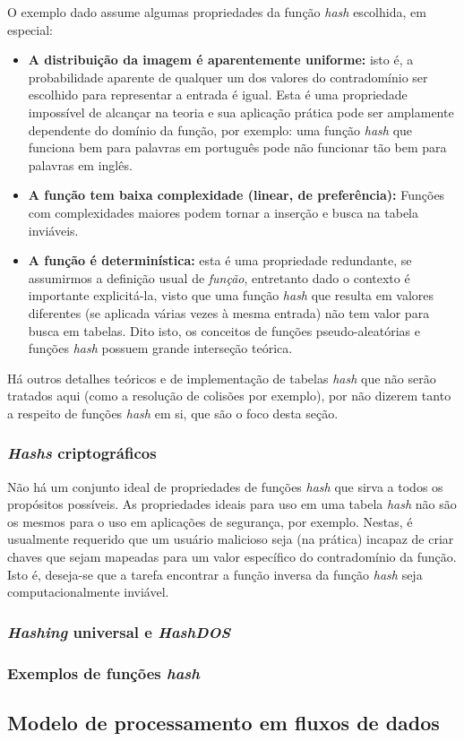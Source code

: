 O exemplo dado assume algumas propriedades da função \emph{hash} escolhida, em especial:
\begin{itemize}
  \item \textbf{A distribuição da imagem é aparentemente uniforme:} isto é, a probabilidade aparente de qualquer um dos valores do contradomínio ser escolhido para representar a entrada é igual. Esta é uma propriedade impossível de alcançar na teoria e sua aplicação prática pode ser amplamente dependente do domínio da função, por exemplo: uma função \emph{hash} que funciona bem para palavras em português pode não funcionar tão bem para palavras em inglês.
  
  \item \textbf{A função tem baixa complexidade (linear, de preferência):} Funções com complexidades maiores podem tornar a inserção e busca na tabela inviáveis.
  
  \item \textbf{A função é determinística:} esta é uma propriedade redundante, se assumirmos a definição usual de \emph{função}, entretanto dado o contexto é importante explicitá-la, visto que uma função \emph{hash} que resulta em valores diferentes (se aplicada várias vezes à mesma entrada) não tem valor para busca em tabelas. Dito isto, os conceitos de funções pseudo-aleatórias e funções \emph{hash} possuem grande interseção teórica.
\end{itemize}

Há outros detalhes teóricos e de implementação de tabelas \emph{hash} que não serão tratados aqui (como a resolução de colisões por exemplo), por não dizerem tanto a respeito de funções \emph{hash} em si, que são o foco desta seção.

\subsubsection{\emph{Hashs} criptográficos}

Não há um conjunto ideal de propriedades de funções \emph{hash} que sirva a todos os propósitos possíveis. As propriedades ideais para uso em uma tabela \emph{hash} não são os mesmos para o uso em aplicações de segurança, por exemplo. Nestas, é usualmente requerido que um usuário malicioso seja (na prática) incapaz de criar chaves que sejam mapeadas para um valor específico do contradomínio da função. Isto é, deseja-se que a tarefa encontrar a função inversa da função \emph{hash} seja computacionalmente inviável.

\subsubsection{\emph{Hashing} universal e \emph{HashDOS}}

\subsubsection{Exemplos de funções \emph{hash}}



\subsection{Modelo de processamento em fluxos de dados}

